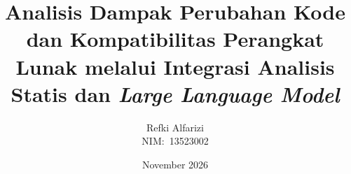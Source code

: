 \title{Analisis Dampak Perubahan Kode dan Kompatibilitas Perangkat Lunak melalui Integrasi Analisis Statis dan \textit{Large Language Model}}
\author{Refki Alfarizi \\ NIM:\ 13523002}
\date{November 2026}
